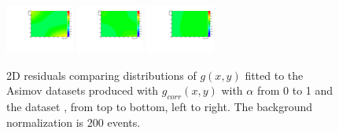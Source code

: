\begin{figure}[thb]
\includegraphics[width=0.2\textwidth]{figures/sec-background/correlation/res_th2F_res_th2f_res_alpha_08_n200.pdf}
\includegraphics[width=0.2\textwidth]{figures/sec-background/correlation/res_th2F_res_th2f_res_alpha_09_n200.pdf}
\includegraphics[width=0.2\textwidth]{figures/sec-background/correlation/res_th2F_res_th2f_res_alpha_10_n200.pdf}
  \caption{2D residuals comparing distributions of $g(x,y)$ fitted to the Asimov datasets produced with $g_{corr}(x,y)$ with $\alpha$ from 0 to 1 and the dataset , from top to bottom, left to right. The background normalization is 200 events.}
  \label{fig:res_norm200}
\end{figure}

